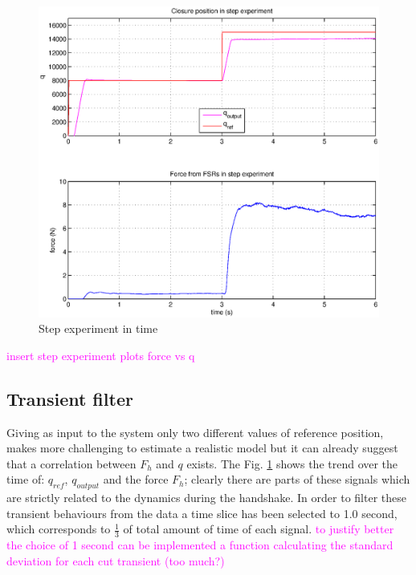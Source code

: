 \begin{figure}[h]
\includegraphics[width=\textwidth]{Figure/step.eps}
  \caption{Step experiment in time}
  \label{Fig:step}
\end{figure}

\textcolor{magenta}{insert step experiment plots force vs q}
\subsection{Transient filter}\label{sec:transient}
Giving as input to the system only two different values of reference position, makes more challenging to estimate a realistic model but it can already suggest that a correlation between $F_{h}$ and $q$ exists.
The Fig. \ref{Fig:step} shows the trend over the time of: $q_{ref}$, $q_{output}$ and the force $F_{h}$; clearly there are parts of these signals which are strictly related to the dynamics during the handshake. 
In order to filter these transient behaviours from the data a time slice has been selected to 1.0 second, which corresponds to $\frac{1}{3}$ of total amount of time of each signal.
\textcolor{magenta}{to justify better the choice of 1 second can be implemented a function calculating the standard deviation for each cut transient (too much?)}


